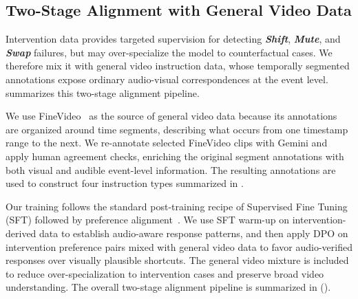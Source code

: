 \documentclass{llmxive}
\providecommand{\shift}{\textbf{\textit{Shift}}\xspace}
\providecommand{\mute}{\textbf{\textit{Mute}}\xspace}
\providecommand{\swap}{\textbf{\textit{Swap}}\xspace}
\begin{document}
\subsection{Two-Stage Alignment with General Video Data}
\label{sec:MGVID}

Intervention data provides targeted supervision for detecting \shift, \mute, and \swap failures, but may over-specialize the model to counterfactual cases. We therefore mix it with general video instruction data, whose temporally segmented annotations expose ordinary audio-visual correspondences at the event level.  summarizes this two-stage alignment pipeline.


We use FineVideo~\cite{Farre2024FineVideo} as the source of general video data because its annotations are organized around time segments, describing what occurs from one timestamp range to the next. We re-annotate selected FineVideo clips with Gemini and apply human agreement checks, enriching the original segment annotations with both visual and audible event-level information. The resulting annotations are used to construct four instruction types summarized in .



Our training follows the standard post-training recipe of Supervised Fine Tuning (SFT) followed by preference alignment~\cite{DBLP:conf/nips/ChristianoLBMLA17, DBLP:journals/corr/abs-1909-08593, DBLP:conf/nips/Ouyang0JAWMZASR22}. 
We use SFT warm-up on intervention-derived data to establish audio-aware response patterns, and then apply DPO on intervention preference pairs mixed with general video data to favor audio-verified responses over visually plausible shortcuts. The general video mixture is included to reduce over-specialization to intervention cases and preserve broad video understanding. The overall two-stage alignment pipeline is summarized in  ().
\end{document}
